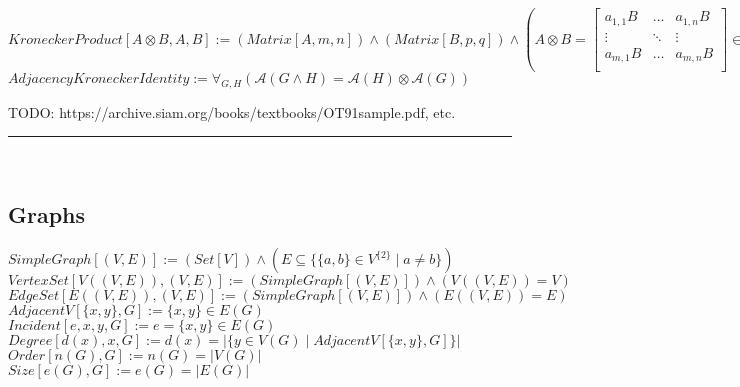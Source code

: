 \documentclass{book}
\newcommand{\abr}{:=}
\newcommand{\pr}[1]{\left(#1\right)}
\newcommand{\st}{\mathbin{|}}
\newcommand{\utup}[1]{\{#1\}}
\newcommand{\notation}[2]{\fbox{{[Notation] \phantom{-} $#1 \abr #2$}}}
\begin{document}
$KroneckerProduct[A \otimes B, A, B] \abr (Matrix[A, m, n]) \land (Matrix[B, p, q]) \land (A \otimes B =
\begin{bmatrix}
  a_{1,1} B & \dots & a_{1, n} B \\
  \vdots & \ddots & \vdots \\
  a_{m, 1} B & \dots & a_{m, n} B \\
\end{bmatrix} \in \mathbb{R}^{m p} \times \mathbb{R}^{n q})$ \\

$AdjacencyKroneckerIdentity \abr \forall_{G, H}\pr{\mathcal{A}(G \land H) = \mathcal{A}(H) \otimes \mathcal{A}(G)}$
\begin{enumerate}
  \lit TODO: https://archive.siam.org/books/textbooks/OT91sample.pdf, etc.
\end{enumerate} \vspace{.75mm} \hrule \vspace{.75mm} \ \\


\subsection{Graphs}
$SimpleGraph[(V, E)] \abr (Set[V]) \land (E \subseteq \{\utup{a, b} \in V^{\{2\}} \st a \neq b\})$ \\
$VertexSet[V\pr{(V, E)}, (V, E)] \abr \pr{SimpleGraph[(V, E)]} \land \pr{V\pr{(V, E)} = V}$ \\
$EdgeSet[E\pr{(V, E)}, (V, E)] \abr \pr{SimpleGraph[(V, E)]} \land \pr{E\pr{(V, E)} = E}$ \\
$AdjacentV[\utup{x, y}, G] \abr \utup{x, y} \in E(G)$ \\ %
$Incident[e, x, y, G] \abr e = \utup{x, y} \in E(G)$ \\
$Degree[d(x), x, G] \abr d(x) = |\{y \in V(G) \st AdjacentV[\utup{x, y}, G]\}|$ \\
$Order[n(G), G] \abr n(G) = |V(G)|$ \\
$Size[e(G), G] \abr e(G) = |E(G)|$ \\
\end{document}
